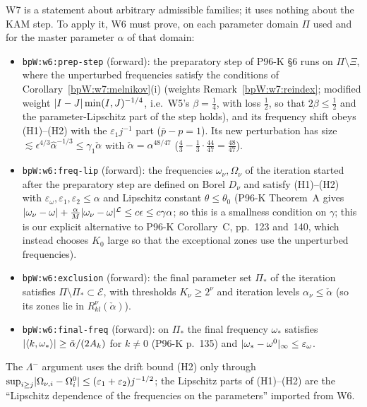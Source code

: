 \begin{remark}\label{bpW:w7:w6-needs}
W7 is a statement about arbitrary admissible families; it uses nothing about the KAM step. To apply it, W6 must
prove, on each parameter domain $\Pi$ used and for the master parameter $\alpha$ of that domain:
\begin{itemize}
\item \texttt{bpW:w6:prep-step} (forward): the preparatory step of P96-K \S6 runs on $\Pi\setminus\Xi$, where the
  unperturbed frequencies satisfy the conditions of Corollary~\ref{bpW:w7:melnikov}(i) (weights
  Remark~\ref{bpW:w7:reindex}; modified weight $\lvert I-J\rvert\min(I,J)^{-1/4}$, i.e.\ W5's $\beta=\frac14$, with loss
  $\frac12$, so that $2\beta\le\frac12$ and the parameter-Lipschitz part of the step holds), and its frequency shift
  obeys (H1)--(H2) with the $\varepsilon_1j^{-1}$ part ($\bar p-p=1$). Its new perturbation has size
  $\lesssim\epsilon^{4/3}\hat\alpha^{-1/3}\le\gamma_1\check\alpha$ with $\check\alpha=\alpha^{48/47}$
  ($\frac43-\frac13\cdot\frac{44}{47}=\frac{48}{47}$).
\item \texttt{bpW:w6:freq-lip} (forward): the frequencies $\omega_\nu,\Omega_\nu$ of the iteration started after the
  preparatory step are defined on Borel $D_\nu$ and satisfy (H1)--(H2) with $\varepsilon_\omega,\varepsilon_1,
  \varepsilon_2\le\alpha$ and Lipschitz constant $\theta\le\theta_0$ (P96-K Theorem~A gives
  $\lvert \omega_\nu-\omega\rvert+\frac\alpha M\lvert \omega_\nu-\omega\rvert^{\mathcal L}\le c\epsilon\le c\gamma\alpha$; so this is a
  smallness condition on $\gamma$; this is our explicit alternative to P96-K Corollary~C, pp.~123 and~140, which instead
  chooses $K_0$ large so that the exceptional zones use the unperturbed frequencies).
\item \texttt{bpW:w6:exclusion} (forward): the final parameter set $\Pi_*$ of the iteration satisfies
  $\Pi\setminus\Pi_*\subset\mathcal E$, with thresholds $K_\nu\ge2^\nu$ and iteration levels $\alpha_\nu\le\check\alpha$
  (so its zones lie in $R^\nu_{kl}(\check\alpha)$).
\item \texttt{bpW:w6:final-freq} (forward): on $\Pi_*$ the final frequency $\omega_*$ satisfies
  $\lvert \langle k,\omega_*\rangle\rvert\ge\check\alpha/(2A_k)$ for $k\neq0$ (P96-K p.~135) and
  $\lvert \omega_*-\omega^0\rvert_\infty\le\varepsilon_\omega$.
\end{itemize}
The $\Lambda^-$ argument uses the drift bound (H2) only through $\sup_{i\ge j}\lvert \Omega_{\nu,i}-\Omega^0_i\rvert\le
(\varepsilon_1+\varepsilon_2)j^{-1/2}$; the Lipschitz parts of (H1)--(H2) are the ``Lipschitz dependence of the
frequencies on the parameters'' imported from W6.
\end{remark}

